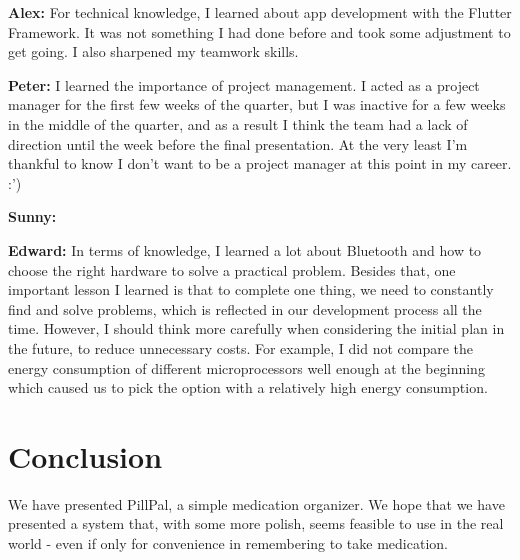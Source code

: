 \documentclass[sigconf]{acmart}
\begin{document}
\textbf{Alex:} For technical knowledge, I learned about app development with the Flutter Framework. It was not something I had done before and took some adjustment to get going. I also sharpened my teamwork skills.

\textbf{Peter:} I learned the importance of project management. I acted as a project manager for the first few weeks of the quarter, but I was inactive for a few weeks in the middle of the quarter, and as a result I think the team had a lack of direction until the week before the final presentation. At the very least I'm thankful to know I don't want to be a project manager at this point in my career. :')

\textbf{Sunny:}

\textbf{Edward:} In terms of knowledge, I learned a lot about Bluetooth and how to choose the right hardware to solve a practical problem. Besides that, one important lesson I learned is that to complete one thing, we need to constantly find and solve problems, which is reflected in our development process all the time. However, I should think more carefully when considering the initial plan in the future, to reduce unnecessary costs. For example, I did not compare the energy consumption of different microprocessors well enough at the beginning which caused us to pick the option with a relatively high energy consumption. 

\section{Conclusion}
We have presented PillPal, a simple medication organizer. We hope that we have presented a system that, with some more polish, seems feasible to use in the real world - even if only for convenience in remembering to take medication.



\end{document}
